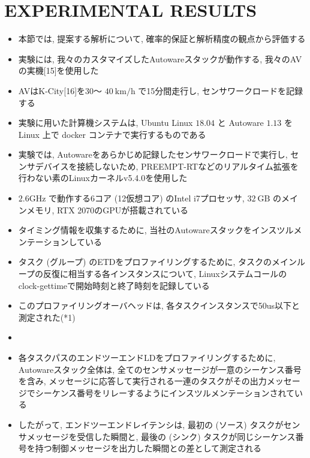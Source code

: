 
\section{EXPERIMENTAL RESULTS}
\label{sec: experimental results}

\begin{frame}{}
    \begin{itemize}
        \item 本節では, 提案する解析について, 確率的保証と解析精度の観点から評価する
\item 実験には, 我々のカスタマイズしたAutowareスタックが動作する, 我々のAVの実機[15]を使用した
\item AVはK-City[16]を30～ $40 \mathrm{~km} / \mathrm{h}$ で15分間走行し, センサワークロードを記録する
    \end{itemize}
\end{frame}

\begin{frame}{}
    \begin{itemize}
        \item 実験に用いた計算機システムは, Ubuntu Linux $18.04$ と Autoware $1.13$ を Linux 上で docker コンテナで実行するものである
\item 実験では, Autowareをあらかじめ記録したセンサワークロードで実行し, センサデバイスを接続しないため, PREEMPT-RTなどのリアルタイム拡張を行わない素のLinuxカーネルv5.4.0を使用した
\item $2.6 \mathrm{GHz}$ で動作する6コア (12仮想コア) のIntel i7プロセッサ, $32 \mathrm{~GB}$ のメインメモリ, RTX 2070のGPUが搭載されている
\item タイミング情報を収集するために, 当社のAutowareスタックをインスツルメンテーションしている
\item タスク (グループ) のETDをプロファイリングするために, タスクのメインループの反復に相当する各インスタンスについて, Linuxシステムコールのclock-gettimeで開始時刻と終了時刻を記録している
    \end{itemize}
\end{frame}

\begin{frame}{}
    \begin{itemize}
        \item このプロファイリングオーバヘッドは, 各タスクインスタンスで50us以下と測定された(*1)
\item
\item 各タスクパスのエンドツーエンドLDをプロファイリングするために, Autowareスタック全体は, 全てのセンサメッセージが一意のシーケンス番号を含み, メッセージに応答して実行される一連のタスクがその出力メッセージでシーケンス番号をリレーするようにインスツルメンテーションされている
\item したがって, エンドツーエンドレイテンシは, 最初の (ソース) タスクがセンサメッセージを受信した瞬間と, 最後の (シンク) タスクが同じシーケンス番号を持つ制御メッセージを出力した瞬間との差として測定される
    \end{itemize}
\end{frame}

